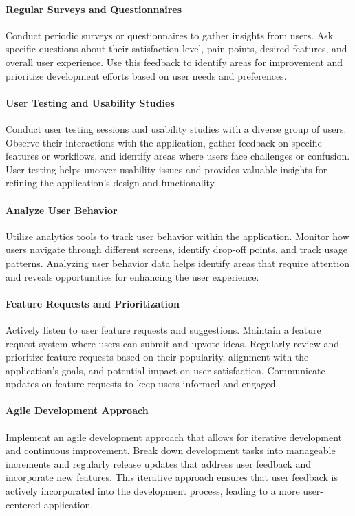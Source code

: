 \paragraph{Regular Surveys and Questionnaires}
Conduct periodic surveys or questionnaires to gather insights from users. Ask specific questions about their 
satisfaction level, pain points, desired features, and overall user experience. Use this feedback to identify 
areas for improvement and prioritize development efforts based on user needs and preferences.

\paragraph{User Testing and Usability Studies}
Conduct user testing sessions and usability studies with a diverse group of users. Observe their interactions with 
the application, gather feedback on specific features or workflows, and identify areas where users face challenges 
or confusion. User testing helps uncover usability issues and provides valuable insights for refining the 
application's design and functionality.

\paragraph{Analyze User Behavior}
Utilize analytics tools to track user behavior within the application. Monitor how users navigate through different 
screens, identify drop-off points, and track usage patterns. Analyzing user behavior data helps identify areas that 
require attention and reveals opportunities for enhancing the user experience.

\paragraph{Feature Requests and Prioritization}
Actively listen to user feature requests and suggestions. Maintain a feature request system where users can submit 
and upvote ideas. Regularly review and prioritize feature requests based on their popularity, alignment with the 
application's goals, and potential impact on user satisfaction. Communicate updates on feature requests to keep 
users informed and engaged.

\paragraph{Agile Development Approach}
Implement an agile development approach that allows for iterative development and continuous improvement. Break 
down development tasks into manageable increments and regularly release updates that address user feedback and 
incorporate new features. This iterative approach ensures that user feedback is actively incorporated into the 
development process, leading to a more user-centered application.

